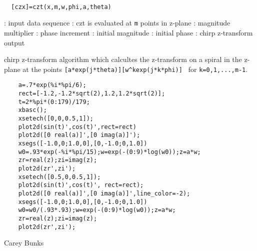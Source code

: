 
\begin{mandesc}
   \\ %
\end{mandesc}
\begin{calling_sequence}
\begin{verbatim}
  [czx]=czt(x,m,w,phi,a,theta)  
\end{verbatim}
\end{calling_sequence}
\begin{parameters}
  \begin{varlist}
    : input data sequence
    : czt is evaluated at \verb!m! points in z-plane
    : magnitude multiplier
    : phase increment
    : initial magnitude
    : initial phase
    : chirp z-transform output
  \end{varlist}
\end{parameters}
\begin{mandescription}
  chirp z-transform algorithm which calcultes the z-transform on a
  spiral in the z-plane at the points
  \verb![a*exp(j*theta)][w^kexp(j*k*phi)] ! for
  \verb!k=0,1,...,m-1!.
\end{mandescription}
\begin{examples}
  \begin{Verbatim}
    a=.7*exp(%i*%pi/6);
    rect=[-1.2,-1.2*sqrt(2),1.2,1.2*sqrt(2)];
    t=2*%pi*(0:179)/179;
    xbasc();
    xsetech([0,0,0.5,1]);
    plot2d(sin(t)',cos(t)',rect=rect)
    plot2d([0 real(a)]',[0 imag(a)]');
    xsegs([-1.0,0;1.0,0],[0,-1.0;0,1.0])
    w0=.93*exp(-%i*%pi/15);w=exp(-(0:9)*log(w0));z=a*w;
    zr=real(z);zi=imag(z);
    plot2d(zr',zi');
    xsetech([0.5,0,0.5,1]);
    plot2d(sin(t)',cos(t)', rect=rect);
    plot2d([0 real(a)]',[0 imag(a)]',line_color=-2);
    xsegs([-1.0,0;1.0,0],[0,-1.0;0,1.0])
    w0=w0/(.93*.93);w=exp(-(0:9)*log(w0));z=a*w;
    zr=real(z);zi=imag(z);
    plot2d(zr',zi');
  \end{Verbatim}
\end{examples}
\begin{authors}
  Carey Bunks
\end{authors}

